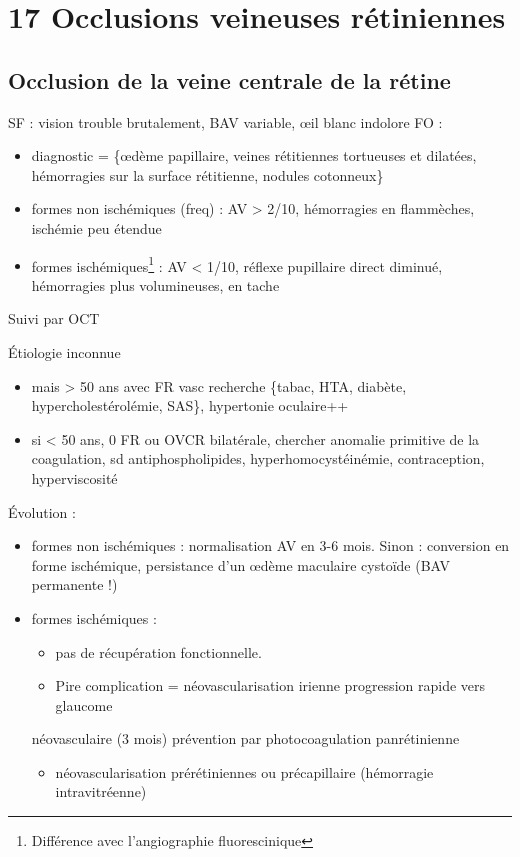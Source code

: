 \documentclass[11pt]{article}
\begin{document}
\section{17 Occlusions veineuses rétiniennes}
\label{sec:org988d660}
\subsection{Occlusion de la veine centrale de la rétine}
\label{sec:org2c16677}
SF : vision trouble brutalement, BAV variable, \oe{}il blanc indolore
FO : 
\begin{itemize}
\item diagnostic = \{\oe{}dème papillaire, veines rétitiennes tortueuses et dilatées,
hémorragies sur la surface rétitienne, nodules cotonneux\}
\item formes non ischémiques (freq) : AV > 2/10, hémorragies en flammèches, ischémie
peu étendue
\item formes ischémiques\footnote{Différence avec l'angiographie fluorescinique} : AV < 1/10, réflexe pupillaire direct diminué, hémorragies
plus volumineuses, en tache
\end{itemize}

Suivi par OCT

Étiologie inconnue 
\begin{itemize}
\item mais > 50 ans avec FR vasc \thus recherche \{tabac, HTA, diabète, hypercholestérolémie, SAS\}, hypertonie oculaire++
\item si < 50 ans, 0 FR ou OVCR bilatérale, chercher anomalie primitive de la
coagulation, sd antiphospholipides, hyperhomocystéinémie, contraception, hyperviscosité
\end{itemize}

Évolution :
\begin{itemize}
\item formes non ischémiques : normalisation AV en 3-6 mois. Sinon : conversion en
forme ischémique, persistance d'un \oe{}dème maculaire cystoïde (BAV permanente !)
\item formes ischémiques : 
\begin{itemize}
\item pas de récupération fonctionnelle.
\item Pire complication = néovascularisation irienne \thus progression rapide vers glaucome
\end{itemize}
néovasculaire (3 mois) \thus prévention par photocoagulation panrétinienne
\begin{itemize}
\item néovascularisation prérétiniennes ou précapillaire (hémorragie intravitréenne)
\end{itemize}
\end{itemize}
\end{document}
